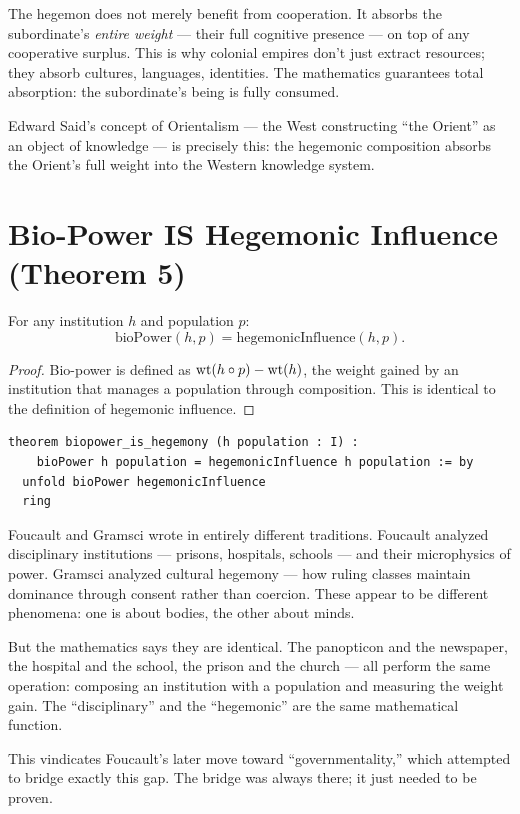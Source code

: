 \begin{paradox}
The hegemon does not merely benefit from cooperation.  It absorbs the subordinate's \emph{entire weight} --- their full cognitive presence --- on top of any cooperative surplus.  This is why colonial empires don't just extract resources; they absorb cultures, languages, identities.  The mathematics guarantees total absorption: the subordinate's being is fully consumed.

Edward Said's concept of Orientalism --- the West constructing ``the Orient'' as an object of knowledge --- is precisely this: the hegemonic composition absorbs the Orient's full weight into the Western knowledge system.
\end{paradox}


\section{Bio-Power IS Hegemonic Influence (Theorem 5)}

\begin{theorem}
\label{thm:foucault-gramsci}
For any institution $h$ and population $p$:
\[
\text{bioPower}(h, p) = \text{hegemonicInfluence}(h, p).
\]
\end{theorem}

\begin{proof}
Bio-power is defined as $\operatorname{wt}(h \circ p) - \operatorname{wt}(h)$, the weight gained by an institution that manages a population through composition.  This is identical to the definition of hegemonic influence.
\end{proof}

\begin{lstlisting}
theorem biopower_is_hegemony (h population : I) :
    bioPower h population = hegemonicInfluence h population := by
  unfold bioPower hegemonicInfluence
  ring
\end{lstlisting}

\begin{interpretation}
Foucault and Gramsci wrote in entirely different traditions.  Foucault analyzed disciplinary institutions --- prisons, hospitals, schools --- and their microphysics of power.  Gramsci analyzed cultural hegemony --- how ruling classes maintain dominance through consent rather than coercion.  These appear to be different phenomena: one is about bodies, the other about minds.

But the mathematics says they are identical.  The panopticon and the newspaper, the hospital and the school, the prison and the church --- all perform the same operation: composing an institution with a population and measuring the weight gain.  The ``disciplinary'' and the ``hegemonic'' are the same mathematical function.

This vindicates Foucault's later move toward ``governmentality,'' which attempted to bridge exactly this gap.  The bridge was always there; it just needed to be proven.
\end{interpretation}


